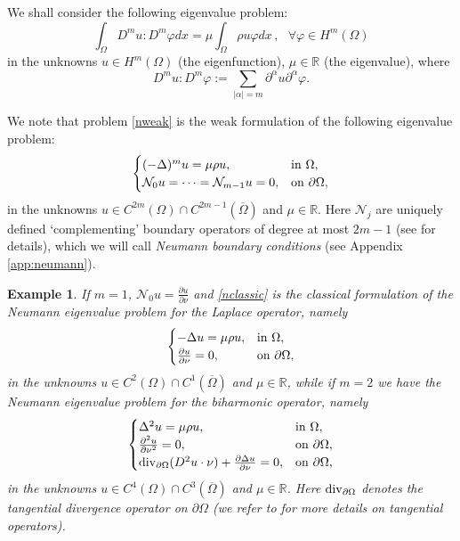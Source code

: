 \documentclass[11pt,a4paper]{amsart}
\numberwithin{equation}{section}
\newtheorem{example}[equation]{Example}
\begin{document}
We shall consider the following eigenvalue problem:
\begin{equation}\label{nweak}
\int_{\Omega}D^m u:D^m \varphi dx=\mu\int_{\Omega}\rho u \varphi dx\,,\ \ \ \forall\varphi\in H^m(\Omega)
\end{equation}
in the unknowns $u\in H^m(\Omega)$ (the eigenfunction), $\mu\in\mathbb R$ (the eigenvalue), where 
$$
D^m u:D^m\varphi:=\sum_{|\alpha|=m}{\partial^{\alpha} u}{\partial^{\alpha}\varphi}.
$$

We note that problem \eqref{nweak} is the weak formulation of the following eigenvalue problem:
\begin{equation}\label{nclassic}
\begin{cases}
(-\Delta)^m u=\mu\rho u,&{\rm in\ }\Omega,\\
\mathcal N_0 u =\cdots=\mathcal N_{m-1} u =0,&{\rm on\ }\partial\Omega,
\end{cases}
\end{equation}
in the unknowns $u\in C^{2m}(\Omega)\cap C^{2m-1}(\overline\Omega)$ and $\mu\in\mathbb R$. Here $\mathcal N_j$ are uniquely defined `complementing' boundary operators of degree at most $2m-1$ (see \cite{gazzola} for details), which we will call {\it Neumann boundary conditions} (see Appendix \ref{app:neumann}). 


\begin{example}
If $m=1$, $\mathcal N_0u=\frac{\partial u}{\partial\nu}$ and \eqref{nclassic} is the classical formulation of the Neumann eigenvalue problem for the Laplace operator, namely
\begin{equation}\label{nclassic1}
\begin{cases}
-\Delta u=\mu\rho u,&{\rm in\ }\Omega,\\
\frac{\partial u}{\partial\nu}=0,&{\rm on\ }\partial\Omega,
\end{cases}
\end{equation}
in the unknowns $u\in C^{2}(\Omega)\cap C^{1}(\overline\Omega)$ and $\mu\in\mathbb R$, while if $m=2$ we have the Neumann eigenvalue problem for the biharmonic operator, namely
\begin{equation}\label{nclassic2}
\begin{cases}
\Delta^2u=\mu\rho u,&{\rm in\ }\Omega,\\
\frac{\partial^2u}{\partial\nu^2}=0,&{\rm on\ }\partial\Omega,\\
{\rm div}_{\partial\Omega}(D^2u\cdot\nu)+\frac{\partial\Delta u}{\partial\nu}=0,&{\rm on\ }\partial\Omega,
\end{cases}
\end{equation}
in the unknowns $u\in C^{4}(\Omega)\cap C^{3}(\overline\Omega)$ and $\mu\in\mathbb R$. Here ${\rm div}_{\partial\Omega}$ denotes the tangential divergence operator on $\partial\Omega$ (we refer to \cite[\S\,7]{shapes} for more details on tangential operators). 
\end{example}
\end{document}

